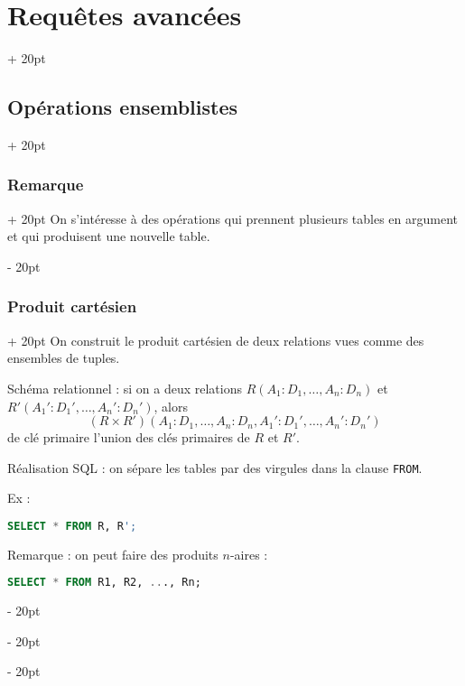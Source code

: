 \documentclass[a4paper, 12pt, twoside]{article}
\newcommand{\ind}[1][20pt]{\advance\leftskip + #1}
\newcommand{\deind}[1][20pt]{\advance\leftskip - #1}
\newenvironment{indt}[2][20pt]{#2 \par \ind[#1]}{\par \deind} %
\begin{document}
    \begin{indt}{\section{Requêtes avancées}}
        \begin{indt}{\subsection{Opérations ensemblistes}}
            \begin{indt}{\subsubsection{Remarque}}
                On s'intéresse à des opérations qui prennent plusieurs tables en argument et qui produisent une nouvelle table.
            \end{indt}

            \vspace{12pt}
            
            \begin{indt}{\subsubsection{Produit cartésien}}
                On construit le produit cartésien de deux relations vues comme des ensembles de tuples.

                Schéma relationnel : si on a deux relations $R(A_1: D_1, \ldots, A_n: D_n)$  et $R'(A_1': D_1', \ldots, A_n': D_n')$, alors
                \[
                    (R \times R')(A_1: D_1, \ldots, A_n: D_n, A_1': D_1', \ldots, A_n': D_n')
                \]
                de clé primaire l'union des clés primaires de $R$ et $R'$.

                Réalisation SQL : on sépare les tables par des virgules dans la clause \texttt{FROM}.

                Ex :
                \begin{lstlisting}[language=SQL, xleftmargin=80pt]
SELECT * FROM R, R';\end{lstlisting}

                Remarque : on peut faire des produits $n$-aires :

                \begin{lstlisting}[language=SQL, xleftmargin=80pt]
SELECT * FROM R1, R2, ..., Rn;\end{lstlisting}


\end{indt}
\end{indt}
\end{indt}
\end{document}
